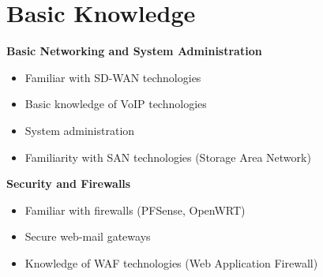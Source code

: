\section{Basic Knowledge}
\begin{paracol}{2}
	\begin{onecolentry}
		\textbf{Basic Networking and System Administration}
		\begin{itemize}[leftmargin=0.5cm, itemsep=0.1cm]
			\item Familiar with SD-WAN technologies
			\item Basic knowledge of VoIP technologies
			\item System administration
			\item Familiarity with SAN technologies (Storage Area Network)
		\end{itemize}
	\end{onecolentry}
	
	\switchcolumn
	\begin{onecolentry}
		\textbf{Security and Firewalls}
		\begin{itemize}[leftmargin=0.5cm, itemsep=0.1cm]
			\item Familiar with firewalls (PFSense, OpenWRT)
			\item Secure web-mail gateways
			\item Knowledge of WAF technologies (Web Application Firewall)
		\end{itemize}
	\end{onecolentry}
\end{paracol}


